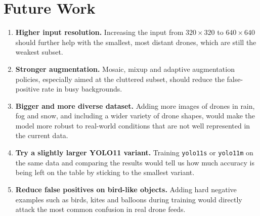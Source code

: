 \documentclass[12pt,a4paper]{report}
\begin{document}
\section{Future Work}
\begin{enumerate}[noitemsep]
    \item \textbf{Higher input resolution.} Increasing the input from
          $320\times320$ to $640\times640$ should further help with the
          smallest, most distant drones, which are still the weakest subset.
    \item \textbf{Stronger augmentation.} Mosaic, mixup and adaptive
          augmentation policies, especially aimed at the cluttered subset,
          should reduce the false-positive rate in busy backgrounds.
    \item \textbf{Bigger and more diverse dataset.} Adding more images of
          drones in rain, fog and snow, and including a wider variety of
          drone shapes, would make the model more robust to real-world
          conditions that are not well represented in the current data.
    \item \textbf{Try a slightly larger YOLO11 variant.} Training
          \texttt{yolo11s} or \texttt{yolo11m} on the same data and comparing
          the results would tell us how much accuracy is being left on the
          table by sticking to the smallest variant.
    \item \textbf{Reduce false positives on bird-like objects.} Adding hard
          negative examples such as birds, kites and balloons during training
          would directly attack the most common confusion in real drone
          feeds.
\end{enumerate}

\end{document}
